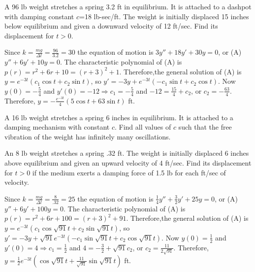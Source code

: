 \documentclass{ximera}
\begin{document}
\begin{problem}\label{exer:6.2.4}
A 96 lb weight stretches a spring 3.2 ft in equilibrium. It is
attached to a dashpot with damping constant $c$=18 lb-sec/ft. The
weight is initially displaced 15 inches below equilibrium and given a
downward velocity of 12 ft/sec. Find its displacement for $t>0$.

\begin{solution}
    Since $k=\frac{mg}{\Delta l}=\frac{96}{3.2}=30$ the equation of
motion is $3y''+18y'+30y=0$, or (A) $y''+6y'+10y=0$. The
characteristic polynomial of (A) is $p(r)=r^2+6r+10=(r+3)^2+1$.
Therefore,the general solution of (A) is $y=e^{-3t}(c_1\cos t+c_2\sin
t)$, so $y'=-3y+e^{-3t}(-c_1\sin t+c_2\cos t)$. Now
$y(0)=-\frac{5}{4}$ and $y'(0)=-12\Rightarrow c_1=-\frac{5}{4}$
and $-12=\frac{15}{4}+c_2$, or $c_2=-\frac{63}{4}$. Therefore,
$y=-\frac{e^{-3t}}{4}(5\cos t+63\sin t)$ ft.
\end{solution}
\end{problem}

\begin{problem}\label{exer:6.2.5}
  A 16 lb weight  stretches a spring 6 inches in equilibrium.
It is attached to a damping mechanism with constant $c$.  Find all values
of $c$ such that the free vibration of the weight has infinitely many
oscillations.
\end{problem}

\begin{problem}\label{exer:6.2.6}
An 8 lb weight stretches a spring .32 ft. The weight is initially
displaced 6 inches above equilibrium and given an upward velocity of 4
ft/sec. Find its displacement for $t>0$ if the medium exerts a
damping force of 1.5 lb for each ft/sec of velocity.

\begin{solution}
    Since $k=\frac{mg}{\Delta l}=\frac{8}{.32}=25$ the equation of
motion is $\frac{1}{4}y''+\frac{3}{2}y'+25y=0$, or (A)
$y''+6y'+100y=0$. The characteristic polynomial of (A) is
$p(r)=r^2+6r+100=(r+3)^2+91$. Therefore,the general solution of (A) is
$y=e^{-3t}(c_1\cos\sqrt{91}t+c_2\sin\sqrt{91}t)$, so
$y'=-3y+\sqrt{91}e^{-3t}(-c_1\sin\sqrt{91}t+c_2\cos\sqrt{91}t)$. Now
$y(0)=\frac{1}{2}$ and $y'(0)=4\Rightarrow c_1=\frac{1}{2}$ and
$4=-\frac{3}{2}+\sqrt{91}c_2$, or $c_2=\frac{11}{2\sqrt{91}}$.
Therefore,$y=\frac{1}{2}e^{-3t}\left(\cos\sqrt{91}t+\frac{11}{
\sqrt{91}}\sin\sqrt{91}t\right)$ ft.
\end{solution}
\end{problem}
\end{document}
